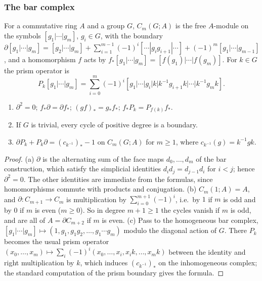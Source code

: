 \subsubsection{The bar complex}

For a commutative ring $A$ and a group $G$, $C_m(G;A)$ is the free $A$-module on the symbols $[g_1|\cdots|g_m]$, $g_i\in G$, with the
boundary $\partial[g_1|\cdots|g_m]=[g_2|\cdots|g_m]+\sum_{i=1}^{m-1}(-1)^i[\cdots|g_ig_{i+1}|\cdots]+(-1)^m[g_1|\cdots|g_{m-1}]$, and a
homomorphism $f$ acts by $f_*[g_1|\cdots|g_m]=[f(g_1)|\cdots|f(g_m)]$. For $k\in G$ the prism operator is
\[
 P_k[g_1|\cdots|g_m]=\sum_{i=0}^m(-1)^i[g_1|\cdots|g_i|k|k^{-1}g_{i+1}k|\cdots|k^{-1}g_mk].
\]

\begin{lemma}\label{pf:vwin:schain}
\begin{enumerate}[label=(\alph*)]
\item $\partial^2=0$; $f_*\partial=\partial f_*$; $(gf)_*=g_*f_*$; $f_*P_k=P_{f(k)}f_*$.
\item If $G$ is trivial, every cycle of positive degree is a boundary.
\item $\partial P_k+P_k\partial=(c_{k^{-1}})_*-1$ on $C_m(G;A)$ for $m\ge1$, where $c_{k^{-1}}(g)=k^{-1}gk$.
\end{enumerate}
\end{lemma}

\begin{proof}
(a) $\partial$ is the alternating sum of the face maps $d_0,\dots,d_m$ of the bar construction, which satisfy the simplicial identities
$d_id_j=d_{j-1}d_i$ for $i<j$; hence $\partial^2=0$. The other identities are immediate from the formulas, since homomorphisms commute with
products and conjugation. (b) $C_m(1;A)=A$, and $\partial:C_{m+1}\to C_m$ is multiplication by $\sum_{i=0}^{m+1}(-1)^i$, i.e.\ by $1$ if $m$ is
odd and by $0$ if $m$ is even ($m\ge0$). So in degree $m+1\ge1$ the cycles vanish if $m$ is odd, and are all of $A=\partial C_{m+2}$ if $m$ is even.
(c) Pass to the homogeneous bar complex, $[g_1|\cdots|g_m]\mapsto(1,g_1,g_1g_2,\dots,g_1\cdots g_m)$ modulo the diagonal action of $G$. There
$P_k$ becomes the usual prism operator $(x_0,\dots,x_m)\mapsto\sum_i(-1)^i(x_0,\dots,x_i,x_ik,\dots,x_mk)$ between the identity and right
multiplication by $k$, which induces $(c_{k^{-1}})_*$ on the inhomogeneous complex; the standard computation of the prism boundary gives the
formula.
\end{proof}
